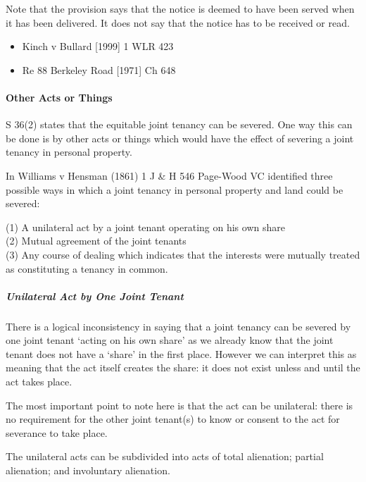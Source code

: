 \documentclass[
]{article}
\providecommand{\tightlist}{%
  \setlength{\itemsep}{0pt}\setlength{\parskip}{0pt}}
\begin{document}
Note that the provision says that the notice is deemed to have been
served when it has been delivered. It does not say that the notice has
to be received or read.

\begin{itemize}
\tightlist
\item
  Kinch v Bullard {[}1999{]} 1 WLR 423
\item
  Re 88 Berkeley Road {[}1971{]} Ch 648
\end{itemize}

\hypertarget{other-acts-or-things}{%
\paragraph{Other Acts or Things}\label{other-acts-or-things}}

S 36(2) states that the equitable joint tenancy can be severed. One way
this can be done is by other acts or things which would have the effect
of severing a joint tenancy in personal property.

In Williams v Hensman (1861) 1 J \& H 546 Page-Wood VC identified three
possible ways in which a joint tenancy in personal property and land
could be severed:

(1) A unilateral act by a joint tenant operating on his own share\\
(2) Mutual agreement of the joint tenants\\
(3) Any course of dealing which indicates that the interests were
mutually treated as constituting a tenancy in common.

\hypertarget{unilateral-act-by-one-joint-tenant}{%
\subparagraph{Unilateral Act by One Joint
Tenant}\label{unilateral-act-by-one-joint-tenant}}

There is a logical inconsistency in saying that a joint tenancy can be
severed by one joint tenant `acting on his own share' as we already know
that the joint tenant does not have a `share' in the first place.
However we can interpret this as meaning that the act itself creates the
share: it does not exist unless and until the act takes place.

The most important point to note here is that the act can be unilateral:
there is no requirement for the other joint tenant(s) to know or consent
to the act for severance to take place.

The unilateral acts can be subdivided into acts of total alienation;
partial alienation; and involuntary alienation.
\end{document}
